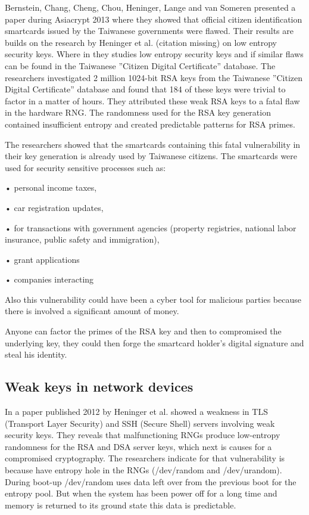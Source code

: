 \documentclass[graybox]{svmult}
\begin{document}
Bernstein, Chang, Cheng, Chou, Heninger, Lange and van Someren presented a paper during Asiacrypt 2013 where they showed that official citizen identification smartcards issued by the Taiwanese governments were flawed. Their results are builds on the  research by Heninger et al. (citation missing) on low entropy security keys. Where in they studies low entropy security keys and if similar flaws can be found in the Taiwanese ”Citizen Digital Certificate” database. The researchers investigated 2 million 1024-bit RSA keys from the Taiwanese ”Citizen Digital Certificate” database and found that 184 of these keys were trivial to factor in a matter of hours. They attributed these weak RSA keys to a fatal flaw in the hardware RNG. The randomness used for the RSA key generation contained insufficient entropy and created predictable patterns for RSA primes.

The researchers showed that the smartcards containing this fatal vulnerability in their key generation is already used by Taiwanese citizens. The smartcards were used for security sensitive processes such as:

• personal income taxes,

• car registration updates,

• for transactions with government agencies (property registries, national labor insurance, public safety and immigration),

• grant applications

• companies interacting

Also this vulnerability could have been a cyber tool for malicious parties because there is involved a significant amount of money. 

Anyone can factor the primes of the RSA key and then to compromised the underlying key, they could then forge the smartcard holder’s digital signature and steal his identity.

\subsection{Weak keys in network devices}
\label{sub-sec:2-2}

In a paper published 2012 by Heninger et al. showed a weakness in TLS (Transport Layer Security) and SSH (Secure Shell) servers involving weak security keys. They reveals that malfunctioning RNGs produce low-entropy randomness for the RSA and DSA server keys, which next is causes for a compromised cryptography. The researchers indicate for that vulnerability is because have entropy hole in the RNGs (/dev/random and /dev/urandom). During boot-up /dev/random uses data left over from the previous boot for the entropy pool. But when the system has been power off for a long time and memory is returned to its ground state this data is predictable.
\end{document}
